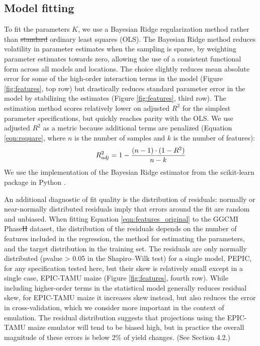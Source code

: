\documentclass[gmdd]{copernicus} %
\providecommand{\DIFadd}[1]{{\protect\color{blue}\uwave{#1}}} %
\providecommand{\DIFdel}[1]{{\protect\color{red}\sout{#1}}}                      %
\providecommand{\DIFaddbegin}{} %
\providecommand{\DIFaddend}{} %
\providecommand{\DIFdelbegin}{} %
\providecommand{\DIFdelend}{} %
\begin{document}
\subsection{Model fitting}
To fit the parameters $K$, we use a Bayesian Ridge regularization method \citep{MacKay91} rather than \DIFdelbegin \DIFdel{standard }\DIFdelend ordinary least squares (OLS). 
The Bayesian Ridge method reduces volatility in parameter estimates when the sampling is sparse, by weighting parameter estimates towards zero, allowing the use of a consistent functional form across all models and locations. 
The choice slightly reduces mean absolute error for some of the high-order interaction terms in the model (Figure \ref{fig:features}, top row) but drastically reduces standard parameter error in the model by stabilizing the estimates (Figure \ref{fig:features}, third row).
The estimation method scores relatively lower on adjusted $R^2$ for the simplest parameter specifications, but quickly reaches parity with the OLS. 
We use adjusted $R^2$ as a metric because additional terms are penalized (Equation \ref{eqn:rsquare}, where $n$ is the number of samples and $k$ is the number of features): 
\begin{equation}
    \centering
    \label{eqn:rsquare}
        \hspace{10mm} R^{2}_{adj} = 1 - \frac{(n-1) \cdot (1 - R^{2})}{n - k}
\end{equation}
We use the implementation of the Bayesian Ridge estimator from the scikit-learn package in Python \citep{scikit-learn}. 

An additional diagnostic of fit quality is the distribution of residuals: normally or near-normally distributed residuals imply that errors around the fit are random and unbiased. 
When fitting Equation \ref{eqn:features_original} to the GGCMI Phase\DIFdelbegin \DIFdel{II }\DIFdelend \DIFaddbegin \DIFadd{~2 }\DIFaddend dataset, the distribution of the residuals depends on the number of features included in the regression, the method for estimating the parameters, and the target distribution in the training set. The residuals are only normally distributed (pvalue > 0.05 in the Shapiro–Wilk test) for a single model, PEPIC, for any specification tested here, but their skew is relatively small except in a single case, EPIC-TAMU maize (Figure \ref{fig:features}, fourth row).
While including higher-order terms in the statistical model generally reduces residual skew, for EPIC-TAMU maize it increases skew instead, but also reduces the error in cross-validation, which we consider more important in the context of emulation.
The residual distribution suggests that projections using the EPIC-TAMU maize emulator will tend to be biased high, but in practice the overall magnitude of these errors is below 2\% of yield changes. (See Section 4.2.)
\end{document}

